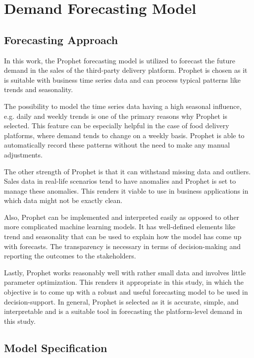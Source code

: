 \section{Demand Forecasting Model}

\subsection{Forecasting Approach}

In this work, the Prophet forecasting model is utilized to forecast the future demand in the sales of the third-party delivery platform. Prophet is chosen as it is suitable with business time series data and can process typical patterns like trends and seasonality. 

The possibility to model the time series data having a high seasonal influence, e.g. daily and weekly trends is one of the primary reasons why Prophet is selected. This feature can be especially helpful in the case of food delivery platforms, where demand tends to change on a weekly basis. Prophet is able to automatically record these patterns without the need to make any manual adjustments. 

The other strength of Prophet is that it can withstand missing data and outliers. Sales data in real-life scenarios tend to have anomalies and Prophet is set to manage these anomalies. This renders it viable to use in business applications in which data might not be exactly clean. 

Also, Prophet can be implemented and interpreted easily as opposed to other more complicated machine learning models. It has well-defined elements like trend and seasonality that can be used to explain how the model has come up with forecasts. The transparency is necessary in terms of decision-making and reporting the outcomes to the stakeholders. 

Lastly, Prophet works reasonably well with rather small data and involves little parameter optimization. This renders it appropriate in this study, in which the objective is to come up with a robust and useful forecasting model to be used in decision-support. In general, Prophet is selected as it is accurate, simple, and interpretable and is a suitable tool in forecasting the platform-level demand in this study.


\subsection{Model Specification}

